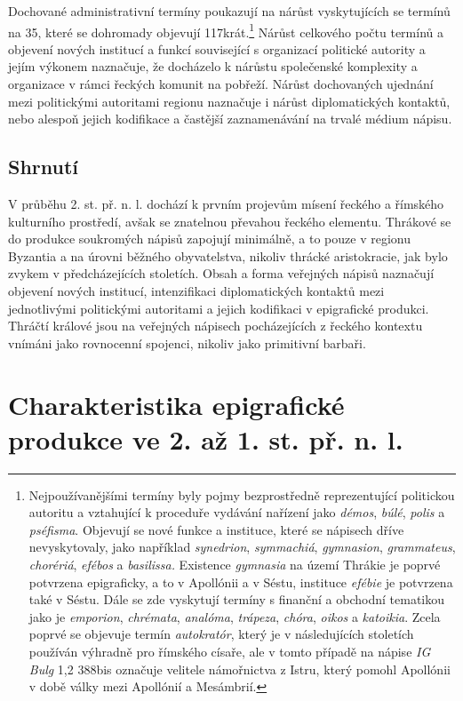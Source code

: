 Dochované administrativní termíny poukazují na nárůst vyskytujících se termínů na 35, které se dohromady objevují 117krát.\footnote{Nejpoužívanějšími termíny byly pojmy bezprostředně reprezentující politickou autoritu a vztahující k proceduře vydávání nařízení jako {\em démos}, {\em búlé}, {\em polis} a {\em pséfisma}. Objevují se nové funkce a instituce, které se nápisech dříve nevyskytovaly, jako například {\em synedrion}, {\em symmachiá}, {\em gymnasion}, {\em grammateus}, {\em chorériá}, {\em efébos} a {\em basilissa.} Existence {\em gymnasia} na území Thrákie je poprvé potvrzena epigraficky, a to v Apollónii a v Séstu, instituce {\em efébie} je potvrzena také v Séstu. Dále se zde vyskytují termíny s finanční a obchodní tematikou jako je {\em emporion}, {\em chrémata}, {\em analóma}, {\em trápeza}, {\em chóra}, {\em oikos} a {\em katoikia}. Zcela poprvé se objevuje termín {\em autokratór}, který je v následujících stoletích používán výhradně pro římského císaře, ale v tomto případě na nápise {\em IG Bulg} 1,2 388bis označuje velitele námořnictva z Istru, který pomohl Apollónii v době války mezi Apollónií a Mesámbrií.} Nárůst celkového počtu termínů a objevení nových institucí a funkcí související s organizací politické autority a jejím výkonem naznačuje, že docházelo k nárůstu společenské komplexity a organizace v rámci řeckých komunit na pobřeží. Nárůst dochovaných ujednání mezi politickými autoritami regionu naznačuje i nárůst diplomatických kontaktů, nebo alespoň jejich kodifikace a častější zaznamenávání na trvalé médium nápisu.

\subsection[shrnutí-11]{Shrnutí}

V průběhu 2. st. př. n. l. dochází k prvním projevům mísení řeckého a římského kulturního prostředí, avšak se znatelnou převahou řeckého elementu. Thrákové se do produkce soukromých nápisů zapojují minimálně, a to pouze v regionu Byzantia a na úrovni běžného obyvatelstva, nikoliv thrácké aristokracie, jak bylo zvykem v předcházejících stoletích. Obsah a forma veřejných nápisů naznačují objevení nových institucí, intenzifikaci diplomatických kontaktů mezi jednotlivými politickými autoritami a jejich kodifikaci v epigrafické produkci. Thráčtí králové jsou na veřejných nápisech pocházejících z řeckého kontextu vnímáni jako rovnocenní spojenci, nikoliv jako primitivní barbaři.

\section[charakteristika-epigrafické-produkce-ve-2.-až-1.-st.-př.-n.-l.]{Charakteristika epigrafické produkce ve 2. až 1. st. př. n. l.}

